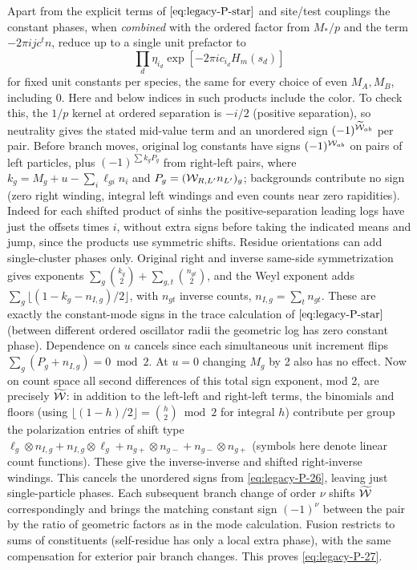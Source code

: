 Apart from the explicit terms of \(\eqref{eq:legacy-P-star}\) and site/test couplings the constant phases, when \emph{combined} with the ordered factor from \(M_*/p\) and the term \(-2\pi i j c^t n\), reduce up to a single unit prefactor to
\begin{equation}
 \prod_d \eta_{i_d} \exp[-2\pi i c_{i_d} H_m(s_d)]
 \label{eq:legacy-P-27}
\end{equation}
for fixed unit constants per species, the same for every choice of even \(M_A,M_B\), including 0. Here and below indices in such products include the color. To check this, the \(1/p\) kernel at ordered separation is \(-i/2\) (positive separation), so neutrality gives the stated mid-value term and an unordered sign \((-1)^{\widetilde{\cal W}_{ab}}\) per pair. Before branch moves, original log constants have signs \((-1)^{{\cal W}_{ab}}\) on pairs of left particles, plus \((-1)^{\sum k_g P_g}\) from right-left pairs, where \(k_g=M_g+u-\sum_i\ell_{gi} n_i\) and \(P_g=({\cal W}_{R,L'} n_{L'})_g\); backgrounds contribute no sign (zero right winding, integral left windings and even counts near zero rapidities). Indeed for each shifted product of sinhs the positive-separation leading logs have just the offsets times \(i\), without extra signs before taking the indicated means and jump, since the products use symmetric shifts. Residue orientations can add single-cluster phases only. Original right and inverse same-side symmetrization gives exponents \(\sum_g\binom{k_g}2+\sum_{g,t}\binom{n_{gt}}2\), and the Weyl exponent adds \(\sum_g\lfloor(1-k_g-n_{I,g})/2\rfloor\), with \(n_{gt}\) inverse counts, \(n_{I,g}=\sum_t n_{gt}\). These are exactly the constant-mode signs in the trace calculation of \(\eqref{eq:legacy-P-star}\) (between different ordered oscillator radii the geometric log has zero constant phase). Dependence on \(u\) cancels since each simultaneous unit increment flips \(\sum_g(P_g+n_{I,g})=0\bmod2\). At \(u=0\) changing \(M_g\) by 2 also has no effect. Now on count space all second differences of this total sign exponent, mod 2, are precisely \(\widetilde{\cal W}\): in addition to the left-left and right-left terms, the binomials and floors (using \(\lfloor(1-h)/2\rfloor=\binom h2\bmod 2\) for integral \(h\)) contribute per group the polarization entries of shift type
\(\ell_g\otimes n_{I,g}+n_{I,g}\otimes\ell_g+n_{g+}\otimes n_{g-}+n_{g-}\otimes n_{g+}\) (symbols here denote linear count functions). These give the inverse-inverse and shifted right-inverse windings. This cancels the unordered signs from \eqref{eq:legacy-P-26}, leaving just single-particle phases. Each subsequent branch change of order \(\nu\) shifts \(\widetilde{\cal W}\) correspondingly and brings the matching constant sign \((-1)^\nu\) between the pair by the ratio of geometric factors as in the mode calculation. Fusion restricts to sums of constituents (self-residue has only a local extra phase), with the same compensation for exterior pair branch changes. This proves \eqref{eq:legacy-P-27}.



